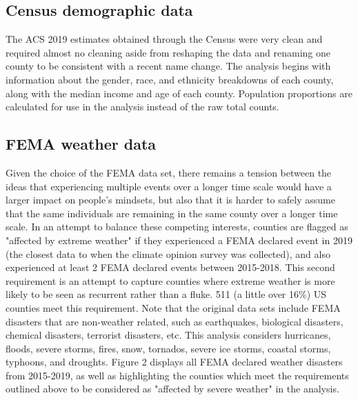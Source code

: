 \documentclass{article}
\begin{document}
\subsection{Census demographic data}
The ACS 2019 estimates obtained through the Census were very clean and
required almost no cleaning aside from reshaping the data and renaming one
county to be consistent with a recent name change. The analysis begins with  
information about the gender, race, and ethnicity breakdowns of each county,
along with the median income and age of each county. Population
proportions are calculated for use in the analysis instead of the raw total counts.

\subsection{FEMA weather data}
Given the choice of the FEMA data set, there remains a tension between the
ideas that experiencing multiple events over a longer time scale would have
a larger impact on people's mindsets, but also that it is harder to safely
assume that the same individuals are remaining in the same county over a
longer time scale. In an attempt to balance these competing interests,
counties are flagged as "affected by extreme weather" if they experienced
a FEMA declared event in 2019 (the closest data to when the climate opinion
survey was collected), and also experienced at least 2 FEMA declared events
between 2015-2018. This second requirement is an attempt to capture counties
where extreme weather is more likely to be seen as recurrent rather than a
fluke. 511 (a little over 16\%) US counties meet this requirement. Note that
the original data sets include FEMA disasters that are non-weather related,
such as earthquakes, biological disasters, chemical disasters, terrorist
disasters, etc. This analysis considers hurricanes, floods, severe storms,
fires, snow, tornados, severe ice storms, coastal storms, typhoons, and
droughts. Figure 2 displays all FEMA declared weather disasters from 2015-2019,
as well as highlighting the counties which meet the requirements outlined above
to be considered as "affected by severe weather" in the analysis.
\end{document}
